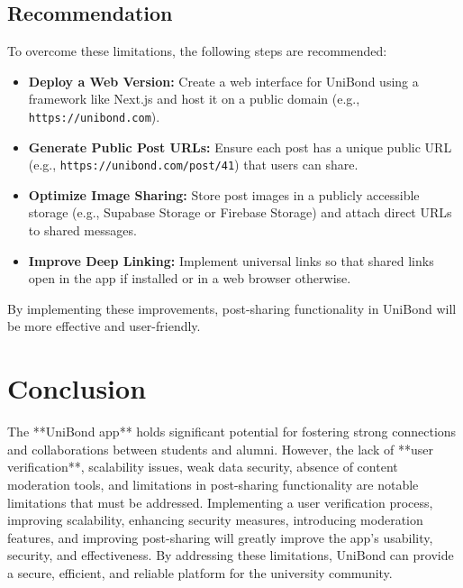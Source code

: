 \documentclass[12pt, a4paper]{report}
\begin{document}
\subsection*{Recommendation}
To overcome these limitations, the following steps are recommended:

\begin{itemize}
    \item \textbf{Deploy a Web Version:} Create a web interface for UniBond using a framework like Next.js and host it on a public domain (e.g., \texttt{https://unibond.com}).
    \item \textbf{Generate Public Post URLs:} Ensure each post has a unique public URL (e.g., \texttt{https://unibond.com/post/41}) that users can share.
    \item \textbf{Optimize Image Sharing:} Store post images in a publicly accessible storage (e.g., Supabase Storage or Firebase Storage) and attach direct URLs to shared messages.
    \item \textbf{Improve Deep Linking:} Implement universal links so that shared links open in the app if installed or in a web browser otherwise.
\end{itemize}

By implementing these improvements, post-sharing functionality in UniBond will be more effective and user-friendly.

\section*{Conclusion}
The **UniBond app** holds significant potential for fostering strong connections and collaborations between students and alumni. However, the lack of **user verification**, scalability issues, weak data security, absence of content moderation tools, and limitations in post-sharing functionality are notable limitations that must be addressed. Implementing a user verification process, improving scalability, enhancing security measures, introducing moderation features, and improving post-sharing will greatly improve the app’s usability, security, and effectiveness. By addressing these limitations, UniBond can provide a secure, efficient, and reliable platform for the university community.








\newpage


 
\end{document}
